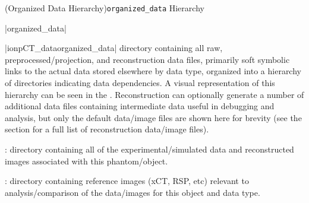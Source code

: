 \Subsection(Organized Data Hierarchy){\texttt{organized\_data} Hierarchy}
\begin{tcbenvironment}|organized\_data|
\begin{tcbparbox}|\dirsep ion\dirsep pCT\_data\dirsep organized\_data|%
\bfdash directory containing all raw, preprocessed/projection, and reconstruction data files, primarily soft symbolic links to the actual data stored elsewhere by data type, organized into a hierarchy of directories indicating data dependencies.  A visual representation of this hierarchy can be seen in the . Reconstruction can optionally generate a number of additional data files containing intermediate data useful in debugging and analysis, but only the default data/image files are shown here for brevity (see the  section for a full list of reconstruction data/image files).
%
\end{tcbparbox}
\begin{tcbenumbox}
    \begin{ThinEnum}
        \item {} : directory containing all of the experimental/simulated data and reconstructed images associated with this phantom/object.
        \begin{ThinEnum}
            \item {} : directory containing reference images (xCT, RSP, etc) relevant to analysis/comparison of the data/images for this object and data type.

\end{ThinEnum}
\end{ThinEnum}
\end{tcbenumbox}
\end{tcbenvironment}
